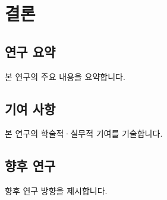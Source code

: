 \chapter{결\quad 론}
\label{ch:conclusion}

\section{연구 요약}

본 연구의 주요 내용을 요약합니다.

\section{기여 사항}

본 연구의 학술적·실무적 기여를 기술합니다.

\section{향후 연구}

향후 연구 방향을 제시합니다.
